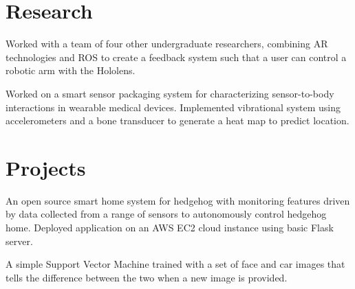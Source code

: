 \documentclass[]{deedy-resume-openfont}
\begin{document}
\begin{minipage}[t]{0.66\textwidth}

\section{Research}
Worked with a team of four other undergraduate researchers, combining AR technologies and ROS to create a feedback system such that a user can control a robotic arm with the Hololens.
\sectionsep

Worked on a smart sensor packaging system for characterizing sensor-to-body interactions in wearable medical devices. Implemented vibrational system using accelerometers and a bone transducer to generate a heat map to predict location.
\sectionsep


\section{Projects}
\descript{}
An open source smart home system for hedgehog with monitoring features driven by data collected from a range of sensors to autonomously control hedgehog home. Deployed application on an AWS EC2 cloud instance using basic Flask server.
\sectionsep

\descript{}
A simple Support Vector Machine trained with a set of face and car images that tells the difference between the two when a new image is provided. 
\sectionsep



\end{minipage} 
\end{document}
